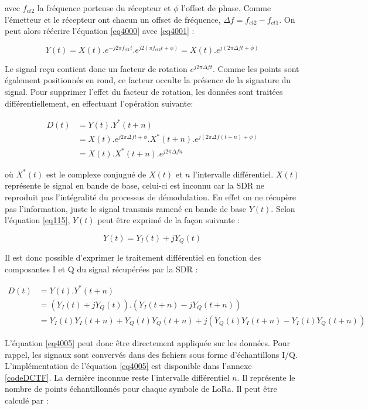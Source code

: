 avec $f_{ct2}$ la fréquence porteuse du récepteur et $\phi$ l'offset de phase. Comme l'émetteur et le récepteur ont chacun un offset de fréquence, $\Delta f = f_{ct2} - f_{ct1}$. On peut alors réécrire l'équation \ref{eq4000} avec \ref{eq4001} :

\begin{equation}\label{eq4002}
	Y(t) = X(t) . e^{-j2\pi f_{ct1} t} . e^{j2(\pi f_{ct2} t+ \phi)} = X(t) . e^{j(2\pi \Delta f t + \phi)}
\end{equation} 

Le signal reçu contient donc un facteur de rotation $e^{j2\pi \Delta f t}$. Comme les points sont également positionnés en rond, ce facteur occulte la présence de la signature du signal.
Pour supprimer l'effet du facteur de rotation, les données sont traitées différentiellement, en effectuant l'opération suivante:

\begin{align}\label{eq4003}
	D(t) &= Y(t) . Y^{*}(t+n) \\
		 &= X(t) . e^{j2\pi \Delta f t+ \phi} .X^{*}(t+n) . e^{j(2\pi \Delta f (t + n) + \phi)} \nonumber \\
 		 &= X(t) . X^{*}(t+n) . e^{j2\pi \Delta f n}
\end{align}

où $X^{*}(t)$ est le complexe conjugué de $X(t)$ et $n$ l'intervalle différentiel. $X(t)$ représente le signal en bande de base, celui-ci est inconnu car la \ac{SDR} ne reproduit pas l'intégralité du processus de démodulation. En effet on ne récupère pas l'information, juste le signal transmis ramené en bande de base $Y(t)$. Selon l'équation \ref{eq115}, $Y(t)$ peut être exprimé de la façon suivante : 

\begin{equation}\label{eq4004}
	Y(t) = Y_I(t) + jY_Q(t)
\end{equation} 

Il est donc possible d'exprimer le traitement différentiel en fonction des composantes I et Q du signal récupérées par la \ac{SDR} :

\begin{align}\label{eq4005}
	D(t) &= Y(t) . Y^{*}(t+n) \nonumber \\
		 &= (Y_I(t) + jY_Q(t)) . (Y_I(t+n) - jY_Q(t+n)) \nonumber \\
 		 &= Y_I(t)Y_I(t+n) + Y_Q(t)Y_Q(t+n) + j(Y_Q(t)Y_I(t+n) - Y_I(t)Y_Q(t+n))
\end{align}

L'équation \ref{eq4005} peut donc être directement appliquée sur les données. Pour rappel, les signaux sont convervés dans des fichiers sous forme d'échantillons \ac{I/Q}. L'implémentation de l'équation \ref{eq4005} est disponible dans l'annexe \ref{codeDCTF}. La dernière inconnue reste l'intervalle différentiel $n$. Il représente le nombre de points échantillonnés pour chaque symbole de \ac{LoRa}. Il peut être calculé par :

